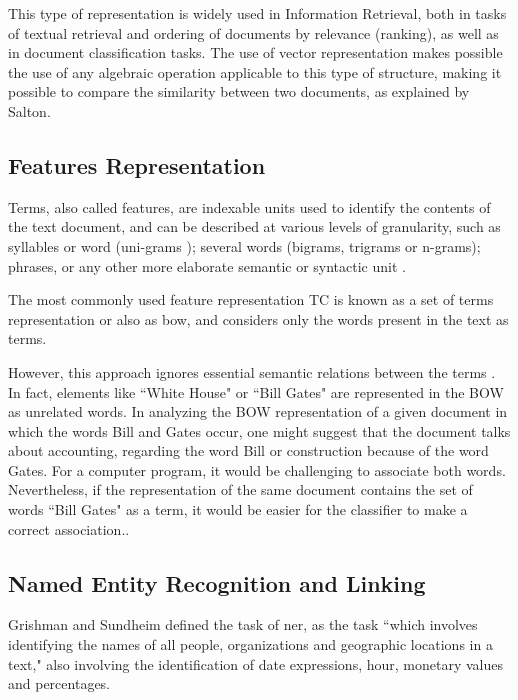 This type of representation is widely used in Information Retrieval, both in tasks of textual retrieval and ordering of documents by relevance (ranking), as well as in document classification tasks. The use of vector representation makes possible the use of any algebraic operation applicable to this type of structure, making it possible to compare the similarity between two documents, as explained by Salton\cite{Salton:1975}.

 

\subsection{\hspace*{3pt}Features Representation}

Terms, also called features\cite{Sebastiani:2002}, are indexable units used to identify the contents of the text document, and can be described at various levels of granularity, such as syllables or word (uni-grams ); several words (bigrams, trigrams or n-grams); phrases, or any other more elaborate semantic or syntactic unit \cite{Lan:2009}.

The most commonly used feature representation TC is known as a set of terms representation or also as \gls{bow}, and considers only the words present in the text as terms.
 
However, this approach ignores essential semantic relations between the terms \cite {Hu:2008}.
In fact, elements like ``White House" or ``Bill Gates" are represented in the BOW as unrelated words. In analyzing the BOW representation of a given document in which the words Bill and Gates occur, one might suggest that the document talks about accounting, regarding the word Bill or construction because of the word Gates. For a computer program, it would be challenging to associate both words.
Nevertheless, if the representation of the same document contains the set of words ``Bill Gates" as a term, it would be easier for the classifier to make a correct association.\cite{bekkerman2004using}.



\subsection{\hspace*{3pt}Named Entity Recognition and Linking }


Grishman and  Sundheim \cite{grishman1996message} defined the task of \gls{ner}, as the task ``which involves identifying the names of all people, organizations and geographic locations in a text," also involving the identification of date expressions, hour, monetary values and percentages. 


